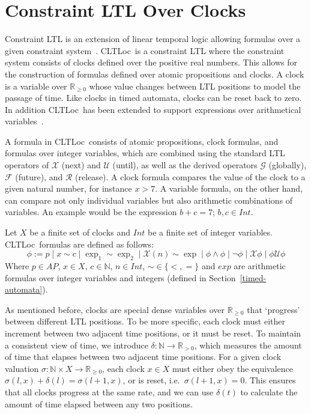 \documentclass[a4paper,11pt]{report}
\newcommand*\BitOr{\mathbin{|}}
\theoremstyle{definition}
\newcommand{\cltloc}{CLTLoc}
\begin{document}
\section{Constraint LTL Over Clocks}\label{cltloc}

Constraint LTL is an extension of linear temporal logic allowing formulas over a
given constraint system~\cite{demri07}. \cltloc\ is a constraint LTL where the
constraint system consists of clocks defined over the positive real numbers.
This allows for the construction of formulas defined over atomic propositions
and clocks. A clock is a variable over \(\mathbb{R}_{\geq 0}\) whose value
changes between LTL positions to model the passage of time. Like clocks in timed
automata, clocks can be reset back to zero. In addition \cltloc\ has been
extended to support expressions over arithmetical variables~\cite{marconi16}.

A formula in \cltloc\ consists of atomic propositions, clock formulas, and
formulas over integer variables, which are combined using the standard LTL
operators of \(\mathcal{X}\) (next) and \(\mathcal{U}\) (until), as well as the
derived operators \(\mathcal{G}\) (globally), \(\mathcal{F}\) (future), and
\(\mathcal{R}\) (release). A clock formula compares the value of the clock to a
given natural number, for instance \(x > 7\). A variable formula, on the other
hand, can compare not only individual variables but also arithmetic combinations
of variables. An example would be the expression \(b + c = 7\); \(b,c \in Int\).

Let \(X\) be a finite set of clocks and \(Int\) be a finite set of integer
variables. \cltloc\ formulas are defined as follows:
\[\phi := p \BitOr x \sim c \BitOr \exp_{1} \sim \exp_{2} \BitOr \mathcal{X}(n) \sim \exp \BitOr \phi \land \phi \BitOr \neg \phi \BitOr \mathcal{X}\phi \BitOr \phi \mathcal{U} \phi \]
Where \(p \in AP\), \(x \in X\), \(c \in \mathbb{N}\), \(n \in Int\),
$\sim \in \{<,=\} $ and \(exp\) are arithmetic formulas over integer variables
and integers (defined in Section~\ref{timed-automata}).

As mentioned before, clocks are special dense variables over
\(\mathbb{R}_{\geq 0}\) that `progress' between different LTL positions. To be
more specific, each clock must either increment between two adjacent time
positions, or it must be reset. To maintain a consistent view of time, we
introduce \(\delta: \mathbb{N} \rightarrow \mathbb{R}_{>0}\), which measures the
amount of time that elapses between two adjacent time positions. For a given
clock valuation \(\sigma: \mathbb{N} \times X \rightarrow \mathbb{R}_{\geq 0}\),
each clock \(x \in X\) must either obey the equivalence
\(\sigma(l,x) + \delta(l) = \sigma(l+1,x)\), or is reset, i.e.\
\(\sigma(l+1,x) = 0\). This ensures that all clocks progress at the same rate,
and we can use \(\delta(t)\) to calculate the amount of time elapsed between any
two positions.
\end{document}
